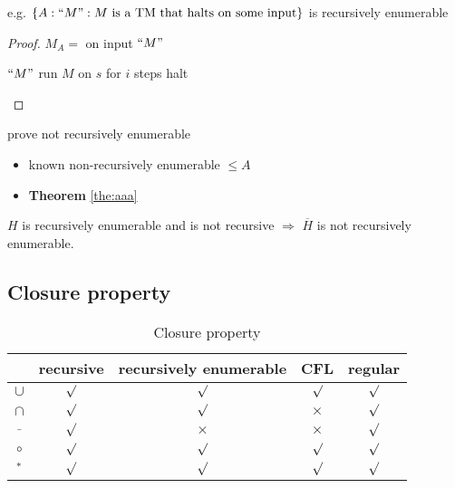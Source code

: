 e.g. $\{ A: {``M"}: M \text{ is a TM that halts on some input} \}$ is recursively enumerable
\begin{proof}
    $M_A=$ on input ${``M"}$
    \begin{algorithm}[H]
        \caption{$M_A$}
        \begin{algorithmic}
            \Require ${``M"}$
                    \State run $M$ on $s$ for $i$ steps
                        \State halt
                    \EndIf
                \EndFor
            \EndFor
        \end{algorithmic}
    \end{algorithm}
    
\end{proof}

prove not recursively enumerable
\begin{itemize}
    \item known non-recursively enumerable $\le A$
    \item \textbf{Theorem} \ref{the:aaa}
\end{itemize}

$H$ is recursively enumerable and is not recursive $\Rightarrow $ $\overline{H}$ is not recursively enumerable. 

\subsection{Closure property}
\begin{table}[!htb]
    \centering
    \caption{Closure property}
    \begin{tabular}[c]{ccccc}\toprule
         &recursive & recursively enumerable & CFL & regular \\ \midrule
        $\cup$ &  $\surd$ & $\surd$ & $\surd$ & $\surd$  \\
        $\cap$ &  $\surd$ & $\surd$ & $\times$ & $\surd$ \\
        $\bar{}$ &$\surd$ & $\times$ & $\times$ & $\surd$ \\
        $\circ$ & $\surd$ & $\surd$ & $\surd$ & $\surd$ \\
        ${}^*$ &  $\surd$ & $\surd$ & $\surd$ & $\surd$ \\
        \bottomrule
    \end{tabular}
\end{table}

